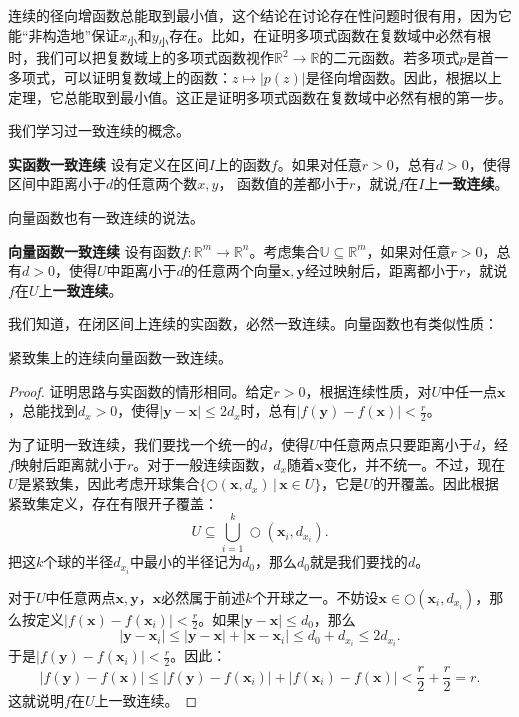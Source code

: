 \documentclass[12pt,UTF8]{ctexbook}
\begin{document}
连续的径向增函数总能取到最小值，这个结论在讨论存在性问题时很有用，因为它能“非构造地”保证$x_{\text{小}}$和$y_{\text{小}}$存在。比如，在证明多项式函数在复数域中必然有根时，我们可以把复数域上的多项式函数视作$\mathbb{R}^2\rightarrow\mathbb{R}$的二元函数。若多项式$p$是首一多项式，可以证明复数域上的函数：$z\mapsto |p(z)|$是径向增函数。因此，根据以上定理，它总能取到最小值。这正是证明多项式函数在复数域中必然有根的第一步。

我们学习过一致连续的概念。
\begin{df}{\textbf{实函数一致连续}}
    设有定义在区间$I$上的函数$f$。如果对任意$r>0$，总有$d>0$，使得区间中距离小于$d$的任意两个数$x,y$，
    函数值的差都小于$r$，就说$f$在$I$上\textbf{一致连续}。
\end{df}

向量函数也有一致连续的说法。
\begin{df}{\textbf{向量函数一致连续}}
    设有函数$f:\mathbb{R}^m \rightarrow \mathbb{R}^n$。考虑集合$\mathbb{U}\subseteq \mathbb{R}^m$，如果对任意$r>0$，总有$d>0$，使得$U$中距离小于$d$的任意两个向量$\mathbf{x},\mathbf{y}$经过映射后，距离都小于$r$，就说$f$在$U$上\textbf{一致连续}。
\end{df}

我们知道，在闭区间上连续的实函数，必然一致连续。向量函数也有类似性质：
\begin{tm}
    紧致集上的连续向量函数一致连续。
\end{tm}

\begin{proof}
    证明思路与实函数的情形相同。给定$r>0$，根据连续性质，对$U$中任一点$\mathbf{x}$，总能找到$d_x > 0$，使得$|\mathbf{y} - \mathbf{x}| \leqslant 2d_x$时，总有$|f(\mathbf{y}) - f(\mathbf{x})| < \frac{r}{2}$。
    
    为了证明一致连续，我们要找一个统一的$d$，使得$U$中任意两点只要距离小于$d$，经$f$映射后距离就小于$r$。对于一般连续函数，$d_x$随着$\mathbf{x}$变化，并不统一。不过，现在$U$是紧致集，因此考虑开球集合$\{\bigcirc(\mathbf{x}, d_x) \, | \, \mathbf{x} \in U \}$，它是$U$的开覆盖。因此根据紧致集定义，存在有限开子覆盖：
    $$U\subseteq \bigcup_{i=1}^k \bigcirc(\mathbf{x}_i, d_{x_i}) .$$
    把这$k$个球的半径$d_{x_i}$中最小的半径记为$d_0$，那么$d_0$就是我们要找的$d$。

    对于$U$中任意两点$\mathbf{x},\mathbf{y}$，$\mathbf{x}$必然属于前述$k$个开球之一。不妨设$\mathbf{x}\in \bigcirc(\mathbf{x}_i, d_{x_i})$，那么按定义$|f(\mathbf{x}) - f(\mathbf{x}_i)| < \frac{r}{2}$。如果$|\mathbf{y} - \mathbf{x}| \leqslant d_0$，那么
    $$ |\mathbf{y} - \mathbf{x}_i| \leqslant |\mathbf{y} - \mathbf{x}| + |\mathbf{x} - \mathbf{x}_i| \leqslant d_0 + d_{x_i} \leqslant 2d_{x_i}. $$
    于是$|f(\mathbf{y}) - f(\mathbf{x}_i)| < \frac{r}{2}$。因此：
    $$ |f(\mathbf{y}) - f(\mathbf{x})| \leqslant |f(\mathbf{y}) - f(\mathbf{x}_i)| + |f(\mathbf{x}_i) - f(\mathbf{x})| < \frac{r}{2} + \frac{r}{2} = r.$$
    这就说明$f$在$U$上一致连续。
\end{proof}
\end{document}
